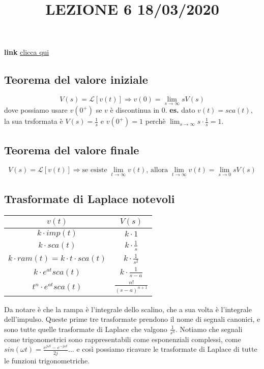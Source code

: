 \title{LEZIONE 6 18/03/2020}\newline
\textbf{link} \href{https://web.microsoftstream.com/video/0c2093a0-44b9-4c83-a0b1-7e61fbd111b5?list=user&userId=faa91214-a6f5-40d7-8875-253fd49b8ce1}{clicca qui}
\subsection{Teorema del valore iniziale}
\[
    V(s) = \mathcal{L}[v(t)] \Longrightarrow v(0) = \lim_{s\rightarrow \infty}s V(s)
\] 
dove possiamo usare $v(0^+)$ se $v$ è discontinua in $0$.\newline
\newline
\textbf{es.} dato $v(t) = sca(t)$, la sua trsformata è $V(s) = \frac{1}{s}$ e $v(0^+) = 1$ perchè $\lim_{s\rightarrow \infty}s \cdot \frac{1}{s} = 1$.
\subsection{Teorema del valore finale}
\[
    V(s) = \mathcal{L}[v(t)] \Longrightarrow \text{se esiste}\; \lim_{t\rightarrow \infty} v(t) \text{, allora}\;\lim_{t\rightarrow \infty} v(t) = \lim_{s\rightarrow 0}sV(s)
\]
\subsection{Trasformate di Laplace notevoli}
\renewcommand{\arraystretch}{2}
\begin{center}
    \begin{tabular}{ |c|c| } 
     \hline
     \;\;\;\;\;\;\;\;\;\;\;\;\;\;\;$v(t)$ \;\;\;\;\;\;\;\;\;\;\;\;\;\;\;& \;\;\;\;\;\;\;\;\;\;\;\;\;\;\;$V(s)$ \;\;\;\;\;\;\;\;\;\;\;\;\;\;\;\\ 
     \hline
     $k \cdot imp(t)$ & $k \cdot 1$ \\ 
     $k \cdot sca(t)$ & $k \cdot \frac{1}{s}$  \\ 
     $k \cdot ram(t) =k \cdot t \cdot  sca(t)$ & $k \cdot \frac{1}{s^2}$ \\
     $k \cdot e^{at}sca(t)$ & $k \cdot \frac{1}{s-a}$ \\ 
     $t^{n}\cdot e^{at}sca(t)$ & $\frac{n!}{(s-a)^{n+1}}$\\ 
     \hline
    \end{tabular}
\end{center}
\renewcommand{\arraystretch}{1}
Da notare è che la rampa è l'integrale dello scalino, che a sua volta è l'integrale dell'impulso. Queste prime tre trasformate prendono il nome di segnali canonici, e sono tutte quelle trasformate di Laplace che valgono $\frac{1}{s^n}$.\newline
\newline
Notiamo che segnali come trigonometrici sono rappresentabili come esponenziali complessi, come $sin(\omega t) = \frac{e^{j \omega t}- e^{-j \omega t}}{2j} \dots$ e così possiamo ricavare le trasformate di Laplace di tutte le funzioni trigonometriche.
